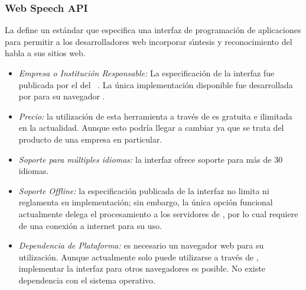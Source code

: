 \subsubsection{Web Speech API}
\label{sec:webspeech}

La  define un est\'andar que especifica una interfaz de programaci\'on de aplicaciones para permitir
a los desarrolladores web incorporar s{\'\i}ntesis y reconocimiento del habla a sus sitios web.

\begin{itemize}
	\item \emph{Empresa o Instituci\'on Responsable:} La especificaci\'on de la interfaz fue
	publicada por el  del
	\mbox{ \cite{GoogleWebSpeechAPI}.}
	La \'unica implementaci\'on disponible fue desarrollada por  para su navegador .
	\item \emph{Precio:} la utilizaci\'on de esta herramienta a trav\'es de  es gratuita e
	ilimitada en la actualidad. Aunque esto podr\'ia llegar a cambiar ya que se trata del producto de una empresa
    en particular.
	\item \emph{Soporte para m\'ultiples idiomas:} la interfaz ofrece soporte para m\'as de 30 idiomas.
	\item \emph{Soporte Offline:} la especificaci\'on publicada de la interfaz no limita ni reglamenta su
	implementaci\'on; sin embargo, la \'unica opci\'on funcional actualmente delega el procesamiento a los
	servidores de , por lo cual requiere de una conexi\'on a internet para su uso.
	\item \emph{Dependencia de Plataforma:} es necesario un navegador web para su utilización.
	Aunque actualmente solo puede utilizarse a trav\'es de , implementar la interfaz
	para otros navegadores es posible. No existe dependencia con el sistema operativo.
\end{itemize}

